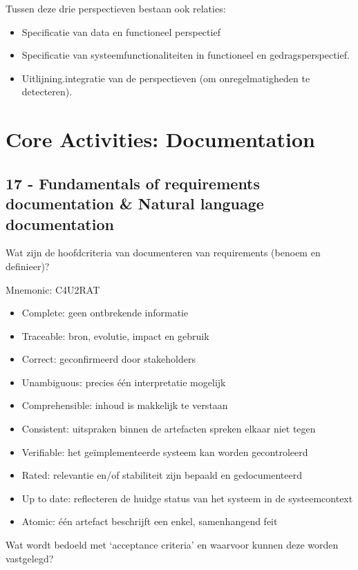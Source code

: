 \documentclass{article}
\begin{document}
Tussen deze drie perspectieven bestaan ook relaties:
\begin{itemize}
\item Specificatie van data en functioneel perspectief
\item Specificatie van systeemfunctionaliteiten in functioneel en gedragsperspectief.
\item Uitlijning.integratie van de perspectieven (om onregelmatigheden te detecteren).
\end{itemize}
\newpage

\section{Core Activities: Documentation}

\setcounter{subsection}{15}
\subsection{17 - Fundamentals of requirements documentation \& Natural language documentation}

\begin{quest} Wat zijn de hoofdcriteria van documenteren van requirements (benoem en definieer)?
\end{quest}
Mnemonic: C4U2RAT
\begin{itemize}
    \item Complete: geen ontbrekende informatie
    \item Traceable: bron, evolutie, impact en gebruik
    \item Correct: geconfirmeerd door stakeholders
    \item Unambiguous: precies \'e\'en interpretatie mogelijk
    \item Comprehensible: inhoud is makkelijk te verstaan
    \item Consistent: uitspraken binnen de artefacten spreken elkaar niet tegen
    \item Verifiable: het ge\"implementeerde systeem kan worden gecontroleerd
    \item Rated: relevantie en/of stabiliteit zijn bepaald en gedocumenteerd
    \item Up to date: reflecteren de huidge status van het systeem in de systeemcontext
    \item Atomic: \'e\'en artefact beschrijft een enkel, samenhangend feit
\end{itemize}

\begin{quest}Wat wordt bedoeld met `acceptance criteria' en waarvoor kunnen deze worden vastgelegd?
\end{quest}
\end{document}
